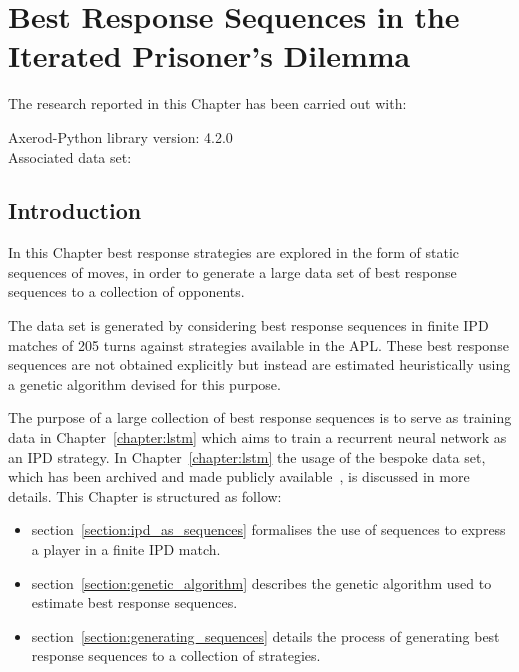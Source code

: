 \chapter{Best Response Sequences in the Iterated Prisoner's Dilemma}\label{chapter:best_response_sequence}

\begin{center}
    The research reported in this Chapter has been carried out with:

    Axerod-Python library version: 4.2.0 \\
    Associated data set: \cite{Glynatsi2020_sequences} \\ \vspace{.5cm}
\end{center}

\section{Introduction}

In this Chapter best response strategies are explored in the form
of static sequences of moves, in order to generate a large data set of best
response sequences to a collection of opponents.

The data set is generated by considering best response sequences in finite IPD
matches of 205 turns against \numberofstrategiesbestsequences strategies
available in the APL. These best response sequences are not obtained explicitly
but instead are estimated heuristically using a genetic algorithm devised for
this purpose.

The purpose of a large collection of best response sequences is
to serve as training data in Chapter~\ref{chapter:lstm} which aims to train a
recurrent neural network as an IPD strategy. In Chapter~\ref{chapter:lstm} the
usage of the bespoke data set, which has been archived and made publicly
available~\cite{Glynatsi2020_sequences}, is discussed in more details. This
Chapter is structured as follow:

\begin{itemize}
    \item section~\ref{section:ipd_as_sequences} formalises the use of sequences to express a player in a
    finite IPD match.
    \item section~\ref{section:genetic_algorithm} describes the genetic algorithm
    used to estimate best response
    sequences.
    \item section~\ref{section:generating_sequences} details the process of
    generating best response sequences to a collection of
    \numberofstrategiesbestsequences strategies.
\end{itemize}


